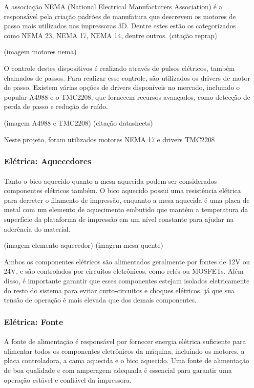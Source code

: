 \documentclass[12pt, english]{article}
\begin{document}
A associação NEMA (National Electrical Manufacturers Association) é a responsável pela criação padrões de manufatura que descrevem os motores de passo mais utilizados nas impressoras 3D. Dentre estes estão os categorizados como NEMA 23, NEMA 17, NEMA 14, dentre outros. (citação reprap)

(imagem motores nema) 

O controle destes dispositivos é realizado através de pulsos elétricos, também chamados de passos. Para realizar esse controle, são utilizados os drivers de motor de passo. Existem várias opções de drivers disponíveis no mercado, incluindo o popular A4988 e o TMC2208, que fornecem recursos avançados, como detecção de perda de passo e redução de ruído.

(imagem A4988 e TMC2208) (citação datasheets)

Neste projeto, foram utilizados motores NEMA 17 e drivers TMC2208 

\subsubsection{Elétrica: Aquecedores}

\paragraph{}
Tanto o bico aquecido quanto a mesa aquecida podem ser considerados componentes elétricos também. O bico aquecido possui uma resistência elétrica para derreter o filamento de impressão, enquanto a mesa aquecida é uma placa de metal com um elemento de aquecimento embutido que mantém a temperatura da superfície da plataforma de impressão em um nível constante para ajudar na aderência do material. 

(imagem elemento aquecedor)
(imagem mesa quente)

Ambos os componentes elétricos são alimentados geralmente por fontes de 12V ou 24V, e são controlados por circuitos eletrônicos, como relés ou MOSFETs. Além disso, é importante garantir que esses componentes estejam isolados eletricamente do resto do sistema para evitar curto-circuitos e choques elétricos, já que sua tensão de operação é mais elevada que dos demais componentes.

\subsubsection{Elétrica: Fonte}

\paragraph{}
A fonte de alimentação é responsável por fornecer energia elétrica suficiente para alimentar todos os componentes eletrônicos da máquina, incluindo os motores, a placa controladora, a cama aquecida e o bico aquecido. Uma fonte de alimentação de boa qualidade e com amperagem adequada é essencial para garantir uma operação estável e confiável da impressora. 
\end{document}
